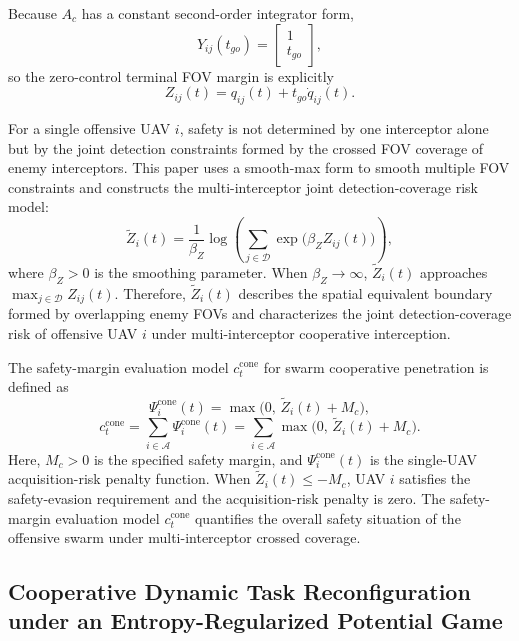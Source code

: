 \documentclass{cja}
\begin{document}
Because $A_c$ has a constant second-order integrator form,
\begin{equation}
Y_{ij}(t_{go})
=
\begin{bmatrix}
1\\
t_{go}
\end{bmatrix},
\end{equation}
so the zero-control terminal FOV margin is explicitly
\begin{equation}
Z_{ij}(t)
=
q_{ij}(t)+t_{go}\dot q_{ij}(t).
\end{equation}

For a single offensive UAV $i$, safety is not determined by one interceptor alone but by the joint detection constraints formed by the crossed FOV coverage of enemy interceptors. This paper uses a smooth-max form to smooth multiple FOV constraints and constructs the multi-interceptor joint detection-coverage risk model:
\begin{equation}
\widetilde Z_i(t)
=
\frac{1}{\beta_Z}
\log\left(
\sum_{j\in\mathcal{D}}
\exp\!\bigl(\beta_Z Z_{ij}(t)\bigr)
\right),
\end{equation}
where $\beta_Z>0$ is the smoothing parameter. When $\beta_Z\to\infty$, $\widetilde Z_i(t)$ approaches $\max_{j\in\mathcal{D}} Z_{ij}(t)$. Therefore, $\widetilde Z_i(t)$ describes the spatial equivalent boundary formed by overlapping enemy FOVs and characterizes the joint detection-coverage risk of offensive UAV $i$ under multi-interceptor cooperative interception.

The safety-margin evaluation model $c_t^{\mathrm{cone}}$ for swarm cooperative penetration is defined as
\begin{equation}
\Psi_i^{\mathrm{cone}}(t)
=
\max\bigl(0,\, \widetilde Z_i(t)+M_c\bigr),
\end{equation}
\begin{equation}
c_t^{\mathrm{cone}}
=
\sum_{i\in\mathcal{A}}
\Psi_i^{\mathrm{cone}}(t)
=
\sum_{i\in\mathcal{A}}
\max\bigl(0,\, \widetilde Z_i(t)+M_c\bigr).
\end{equation}
Here, $M_c>0$ is the specified safety margin, and $\Psi_i^{\mathrm{cone}}(t)$ is the single-UAV acquisition-risk penalty function. When $\widetilde Z_i(t)\le -M_c$, UAV $i$ satisfies the safety-evasion requirement and the acquisition-risk penalty is zero.
The safety-margin evaluation model $c_t^{\mathrm{cone}}$ quantifies the overall safety situation of the offensive swarm under multi-interceptor crossed coverage.

\subsection{Cooperative Dynamic Task Reconfiguration under an Entropy-Regularized Potential Game}
\end{document}

